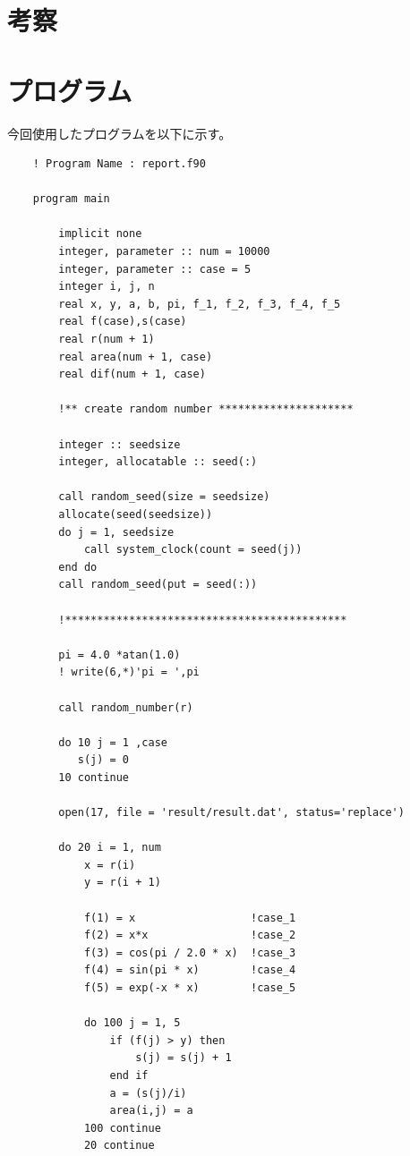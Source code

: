 \documentclass[12pt,a4paper]{jsarticle}
\begin{document}
\newpage
\section{考察}

\newpage
\section{プログラム}
今回使用したプログラムを以下に示す。
\small
\begin{lstlisting}
    ! Program Name : report.f90

    program main
    
        implicit none
        integer, parameter :: num = 10000
        integer, parameter :: case = 5
        integer i, j, n
        real x, y, a, b, pi, f_1, f_2, f_3, f_4, f_5
        real f(case),s(case)
        real r(num + 1)
        real area(num + 1, case)
        real dif(num + 1, case)
    
        !** create random number *********************
        
        integer :: seedsize
        integer, allocatable :: seed(:)
        
        call random_seed(size = seedsize)       
        allocate(seed(seedsize))               
        do j = 1, seedsize
            call system_clock(count = seed(j)) 
        end do
        call random_seed(put = seed(:))         
        
        !********************************************
    
        pi = 4.0 *atan(1.0)
        ! write(6,*)'pi = ',pi
    
        call random_number(r)
    
        do 10 j = 1 ,case
           s(j) = 0
        10 continue
    
        open(17, file = 'result/result.dat', status='replace')
    
        do 20 i = 1, num
            x = r(i)
            y = r(i + 1)
        
            f(1) = x                  !case_1
            f(2) = x*x                !case_2
            f(3) = cos(pi / 2.0 * x)  !case_3
            f(4) = sin(pi * x)        !case_4
            f(5) = exp(-x * x)        !case_5
    
            do 100 j = 1, 5   
                if (f(j) > y) then
                    s(j) = s(j) + 1
                end if    
                a = (s(j)/i)
                area(i,j) = a
            100 continue
            20 continue
    

\end{lstlisting}
\end{document}
